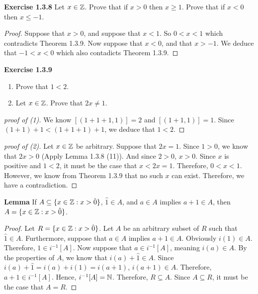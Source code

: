 \noindent \textbf{Exercise 1.3.8} Let \(x \in \mathbb{Z}\). Prove that if \(x > 0\) then \(x \geq 1\).
Prove that if \(x < 0\) then \(x \leq -1\).
\begin{proof}
    Suppose that \(x > 0\), and suppose that \(x < 1\). So \(0 < x < 1\) which contradicts Theorem 1.3.9. Now suppose that \(x < 0\), and that \(x > -1\).
    We deduce that \(-1 < x < 0\) which also contadicts Theorem 1.3.9.
\end{proof}



\noindent \textbf{Exercise 1.3.9}
\begin{enumerate}
    \item Prove that \(1 < 2\).
    \item Let \(x \in \mathbb{Z}\). Prove that \(2x \neq 1\).
\end{enumerate}
\begin{proof}[proof of (1)]
    We know \([(1+1+1, 1)] = 2\) and \([(1+1, 1)] = 1\). Since \((1+1) + 1 < (1+1+1) + 1\), we deduce that \(1 < 2\).
\end{proof}
\begin{proof}[proof of (2)]
    Let \(x \in \mathbb{Z}\) be arbitrary. Suppose that \(2x = 1\). Since \(1 > 0\), we know that \(2x > 0\) (Apply Lemma 1.3.8 (11)). And since \(2 > 0\), \(x > 0\).
    Since \(x\) is positive and \(1 < 2\), it must be the case that \(x < 2x = 1\). Therefore, \(0 < x < 1\). However, we know from Theorem 1.3.9 that no such \(x\) can exist. Therefore, we have a contradiction.
\end{proof}


\newpage
\noindent \textbf{Lemma} If \(A \subseteq \{x \in \mathbb{Z} : x > \hat{0}\}\), \(\hat{1} \in A\), and \(a \in A\) implies \(a + 1 \in A\), then \(A = \{x \in \mathbb{Z} : x > \hat{0}\}\).
\begin{proof}
    Let \(R = \{x \in \mathbb{Z} : x > \hat{0}\}\). Let \(A\) be an arbitrary subset of \(R\) such that \(\hat{1} \in A\). Furthermore, suppose that \(a \in A\) implies \(a+1 \in A\).
    Obviously \(i(1) \in A\). Therefore, \(1 \in i^{-1}[A]\). Now suppose that \(a \in i^{-1}[A]\), meaning \(i(a) \in A\). By the properties of \(A\), we know that \(i(a)+\hat{1} \in A\). Since \(i(a) + \hat{1} = i(a) + i(1) = i(a+1)\), \(i(a+1) \in A\).
    Therefore, \(a+1 \in i^{-1}[A]\). Hence, \(i^{-1}[A] = \mathbb{N}\). Therefore, \(R \subseteq A\). Since \(A \subseteq R\), it must be the case that \(A = R\).
\end{proof}


